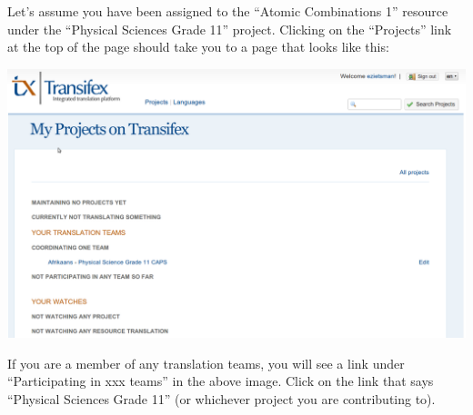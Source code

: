 \documentclass[10pt, a4paper]{article}
\begin{document}
Let's assume you have been assigned to the ``Atomic Combinations 1'' resource under the ``Physical Sciences Grade 11'' project. Clicking on the ``Projects'' link at the top of the page should take you to a page that looks like this:
\begin{center}
    \centerline{\includegraphics[width=0.8\paperwidth]{images/selectproject.png}}
\end{center}
If you are a member of any translation teams, you will see a link under ``Participating in xxx teams'' in the above image. Click on the link that says ``Physical Sciences Grade 11'' (or whichever project you are contributing to).
\end{document}
